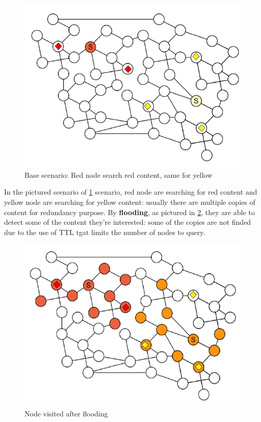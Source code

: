 \documentclass[10pt,a4paper]{report}
\begin{document}
\begin{figure}
	\centering
	\includegraphics[scale=0.60]{images/Pasted image 20230301112043.png}
	\caption{Base scenario: Red node search red content, same for yellow}
	\label{search-eg1}
\end{figure}

In the pictured scenario of \ref{search-eg1} scenario, red node are searching for red content and yellow node are searching for yellow content: usually there are multiple copies of content for redundancy purpose.
By \textbf{flooding}, as pictured in \ref{search-eg1-flooding}, they are able to detect some of the content they're interested: some of the copies are not finded due to the use of TTL tgat limits the number of nodes to query.
\begin{figure}
	\centering
	\includegraphics[scale=0.60]{images/Pasted image 20230301112212.png}
	\caption{Node visited after flooding}
	\label{search-eg1-flooding}
\end{figure}
\end{document}
